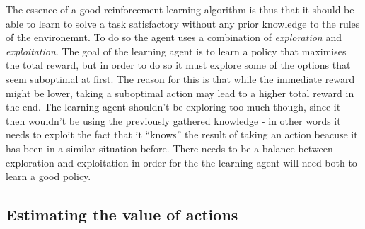 \documentclass[11pt]{article}
\begin{document}
The essence of a good reinforcement learning algorithm is thus that it should be able to learn
to solve a task satisfactory without any prior knowledge to the rules of the environemnt.
To do so the agent uses a combination of \textit{exploration} and \textit{exploitation}.
The goal of the learning agent is to learn a policy that maximises the total reward, but in order to do
so it must explore some of the options that seem suboptimal at first.
The reason for this is that while the immediate reward might be lower, taking a
suboptimal action may lead to a higher total reward in the end.
The learning agent shouldn't be exploring too much though, since it then wouldn't
be using the previously gathered knowledge - in other words it needs to
exploit the fact that it “knows” the result of taking an action beacuse it has been in
a similar situation before.
There needs to be a balance between exploration and exploitation in order for the the
learning agent will need both to learn a good policy.

\subsection{Estimating the value of actions}



%

%
\end{document}

